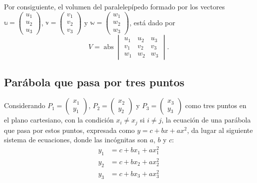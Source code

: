 Por consiguiente, el volumen del paralelepípedo formado por los vectores $\mathbb{u} = \begin{pmatrix}
    u_1 \\
    u_2 \\
    u_3
\end{pmatrix}$, $\mathbb{v} = \begin{pmatrix}
    v_1 \\
    v_2 \\
    v_3
\end{pmatrix}$ y $\mathbb{w} = \begin{pmatrix}
    w_1 \\
    w_2 \\
    w_3
\end{pmatrix}$, está dado por
$$V=\operatorname{abs} \begin{vmatrix}
    u_1 & u_2 & u_3 \\
    v_1 & v_2 & v_3 \\
    w_1 & w_2 & w_3
\end{vmatrix}.$$

\subsection{Parábola que pasa por tres puntos}

Considerando $P_1 = \begin{pmatrix} x_1 \\ y_1 \end{pmatrix}$, $P_2 = \begin{pmatrix} x_2 \\ y_2 \end{pmatrix}$ y $P_3 = \begin{pmatrix} x_3 \\ y_3 \end{pmatrix}$ como tres puntos en el plano cartesiano, con la condición $x_i \neq x_j$ si $i \neq j$, la ecuación de una parábola que pasa por estos puntos, expresada como $y=c+bx+ax^2$, da lugar al siguiente sistema de ecuaciones, donde las incógnitas son $a$, $b$ y $c$:
\begin{align*}
    y_1 &=c+bx_1+ax_1^2 \\
    y_2 &=c+bx_2+ax_2^2 \\
    y_3 &=c+bx_3+ax_3^2
\end{align*}

\newpage

